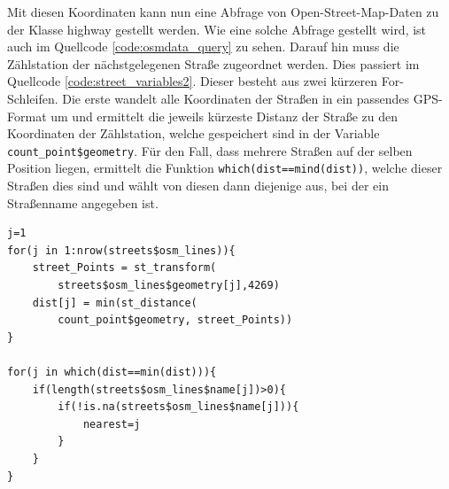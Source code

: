 \documentclass[a4paper,12pt]{thesis}
\begin{document}
Mit diesen Koordinaten kann nun eine Abfrage von Open-Street-Map-Daten zu der Klasse \glqq{}highway\grqq{} gestellt werden. Wie eine solche Abfrage gestellt wird, ist auch im Quellcode \ref{code:osmdata_query} zu sehen. Darauf hin muss die Zählstation der nächstgelegenen Straße zugeordnet werden. Dies passiert im Quellcode \ref{code:street_variables2}. Dieser besteht aus zwei kürzeren For-Schleifen. Die erste wandelt alle Koordinaten der Straßen in ein passendes GPS-Format um und ermittelt die jeweils kürzeste Distanz der Straße zu den Koordinaten der Zählstation, welche gespeichert sind in der Variable \lstinline|count_point$geometry|. Für den Fall, dass mehrere Straßen auf der selben Position liegen, ermittelt die Funktion \lstinline|which(dist==mind(dist))|, welche dieser Straßen dies sind und wählt von diesen dann diejenige aus, bei der ein Straßenname angegeben ist.

\begin{minipage}{\linewidth}
\begin{lstlisting}[caption={Zuordnung zur nächsten Straße},label=code:street_variables2]
j=1
for(j in 1:nrow(streets$osm_lines)){
	street_Points = st_transform(
		streets$osm_lines$geometry[j],4269)
	dist[j] = min(st_distance(
		count_point$geometry, street_Points))
}
	
for(j in which(dist==min(dist))){
	if(length(streets$osm_lines$name[j])>0){
		if(!is.na(streets$osm_lines$name[j])){
			nearest=j
		}
	}
}
\end{lstlisting}
\end{minipage}
\end{document}
